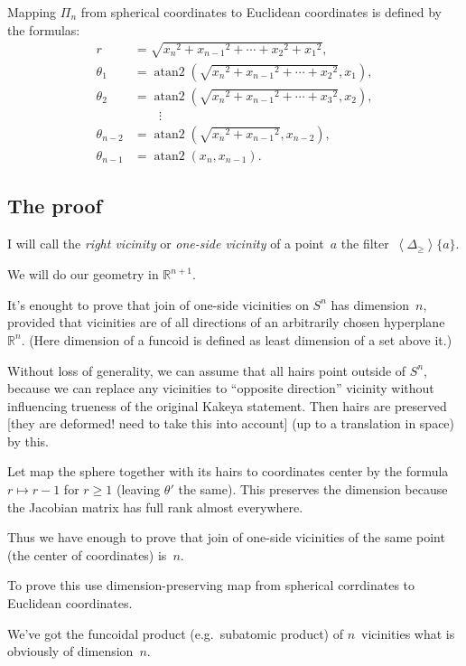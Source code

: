 \documentclass{amsart}
\newcommand{\supfun}[1]{\left\langle#1\right\rangle}
\begin{document}
Mapping $\Pi_n$ from spherical coordinates to Euclidean coordinates is defined by the formulas:
\[
\begin{aligned}r&={\textstyle {\sqrt {{x_{n}}^{2}+{x_{n-1}}^{2}+\cdots +{x_{2}}^{2}+{x_{1}}^{2}}}},\\\theta _{1}&=\operatorname {atan2} \left({\textstyle {\sqrt {{x_{n}}^{2}+{x_{n-1}}^{2}+\cdots +{x_{2}}^{2}}}},x_{1}\right),\\\theta _{2}&=\operatorname {atan2} \left({\textstyle {\sqrt {{x_{n}}^{2}+{x_{n-1}}^{2}+\cdots +{x_{3}}^{2}}}},x_{2}\right),\\&\qquad \vdots \\\theta _{n-2}&=\operatorname {atan2} \left({\textstyle {\sqrt {{x_{n}}^{2}+{x_{n-1}}^{2}}}},x_{n-2}\right),\\\theta _{n-1}&=\operatorname {atan2} \left(x_{n},x_{n-1}\right).\end{aligned}
\]  

\subsection{The proof}

I will call the \emph{right vicinity} or \emph{one-si\-de vicinity} of a point~$a$ the filter~$\supfun{\Delta_{\geq}}\{a\}$.

We will do our geometry in $\mathbb{R}^{n+1}$.

It's enought to prove that join of one-si\-de vicinities on $S^n$ has dimension~$n$, provided that vicinities are of all directions
of an arbitrarily chosen hyperplane~$\mathbb{R}^n$.
(Here dimension of a funcoid is defined as least dimension of a set above it.)

Without loss of generality, we can assume that all hairs point outside of $S^n$, because we can replace any vicinities to ``opposite direction'' vicinity without influencing trueness of the original Kakeya statement. Then hairs are preserved [they are deformed! need to take this into account] (up to a translation in space) by this.

Let map the sphere together with its hairs to coordinates center by the formula $r\mapsto r-1$ for $r\geq 1$ (leaving $\theta'$ the same).
This preserves the dimension because the Jacobian matrix has full rank almost everywhere.

Thus we have enough to prove that join of one-si\-de vicinities of the same point (the center of coordinates) is~$n$.

To prove this use di\-men\-si\-on-pre\-ser\-ving map from spherical corrdinates to Euclidean coordinates.

We've got the funcoidal product (e.g.\ subatomic product) of $n$\ vicinities what is obviously of dimension~$n$.



\end{document}

